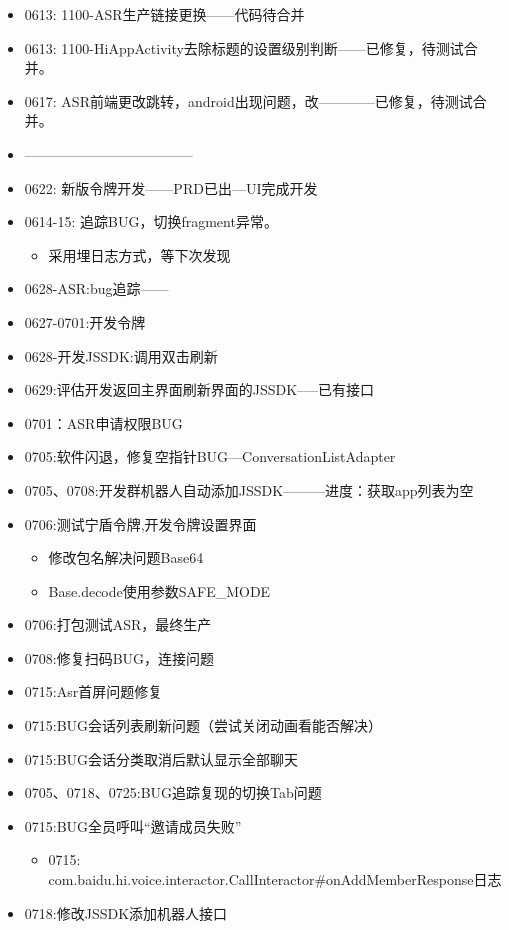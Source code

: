\documentclass{ctexart}
\begin{document}
\begin{itemize}
		\item 0613: 1100-ASR生产链接更换——代码待合并
		\item 0613: 1100-HiAppActivity去除标题的设置级别判断——已修复，待测试合并。
		\item 0617: ASR前端更改跳转，android出现问题，改————已修复，待测试合并。
		\item ————————————
		\item 0622: 新版令牌开发——PRD已出—UI完成开发
		\item 0614-15: 追踪BUG，切换fragment异常。
		\begin{itemize}
			\item 采用埋日志方式，等下次发现
		\end{itemize}
		\item 0628-ASR:bug追踪——
		\item 0627-0701:开发令牌
		\item 0628-开发JSSDK:调用双击刷新
		\item 0629:评估开发返回主界面刷新界面的JSSDK-----已有接口
		\item 0701：ASR申请权限BUG
		\item 0705:软件闪退，修复空指针BUG---ConversationListAdapter
		\item 0705、0708:开发群机器人自动添加JSSDK———进度：获取app列表为空
		\item 0706:测试宁盾令牌,开发令牌设置界面
		\begin{itemize}
			\item 修改包名解决问题Base64
			\item Base.decode使用参数SAFE\_MODE
		\end{itemize}
		\item 0706:打包测试ASR，最终生产
		\item 0708:修复扫码BUG，连接问题
		\item 0715:Asr首屏问题修复
		\item 0715:BUG会话列表刷新问题（尝试关闭动画看能否解决）
		\item 0715:BUG会话分类取消后默认显示全部聊天
		\item 0705、0718、0725:BUG追踪复现的切换Tab问题
		\newline
		\item 0715:BUG全员呼叫“邀请成员失败”
		\begin{itemize}
			\item 0715: com.baidu.hi.voice.interactor.CallInteractor\#onAddMemberResponse日志
		\end{itemize}
		\item 0718:修改JSSDK添加机器人接口

\end{itemize}
\end{document}
